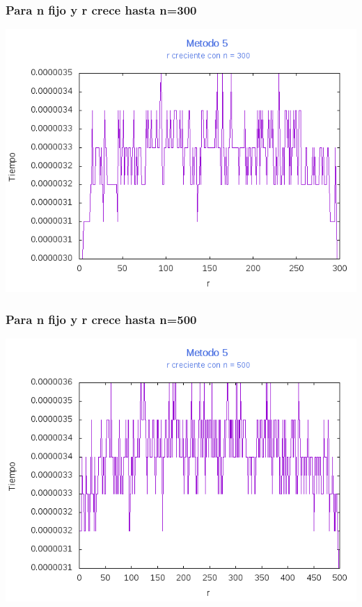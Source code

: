 \documentclass[12pt,letterpaper]{scrartcl}
\begin{document}
\subsubsection{Para n fijo y r crece hasta n=300}
\includegraphics[scale=1]{Metodo5/plot300m5}

\subsubsection{Para n fijo y r crece hasta n=500}
\includegraphics[scale=1]{Metodo5/plot500m5}
\end{document}
